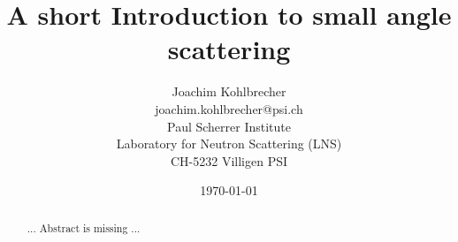 \documentclass[12pt,intlimits,fleqn,reqno,twoside]{report}
\begin{document}


\setcounter{page}{0} \thispagestyle{empty}

\title{A short Introduction to small angle scattering}
\author{Joachim Kohlbrecher
\\joachim.kohlbrecher@psi.ch
\\Paul Scherrer Institute
\\Laboratory for Neutron Scattering (LNS)
\\CH-5232 Villigen PSI}
\date{\today}

\maketitle

\begin{abstract}
... Abstract is missing ...
\end{abstract}


\newpage \tableofcontents

\newpage







%
%
%

\end{document}
